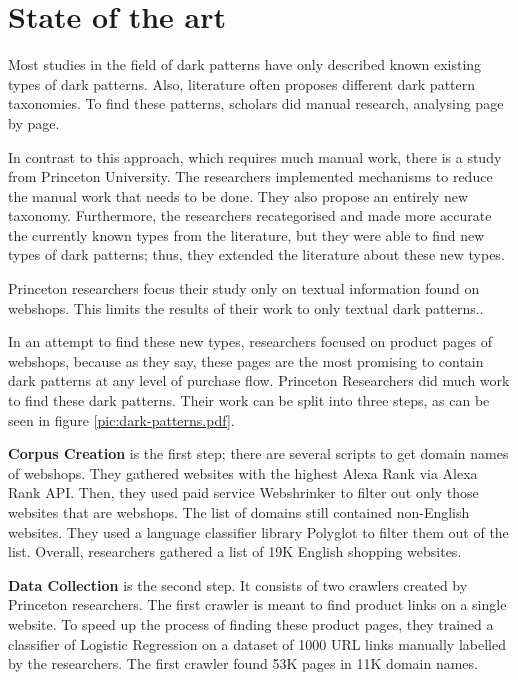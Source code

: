 \chapter{State of the art}
Most studies\cite{dark-patterns-brignull,dark-patterns-colin,taxonomies-conti} in the field of dark patterns have only described known existing types of dark patterns. Also, literature often proposes different dark pattern taxonomies. To find these patterns, scholars did manual research, analysing page by page.

In contrast to this approach, which requires much manual work, there is a study from Princeton University\cite{dark-patterns-at-scale}. The researchers implemented mechanisms to reduce the manual work that needs to be done. They also propose an entirely new taxonomy. Furthermore, the researchers recategorised and made more accurate the currently known types from the literature, but they were able to find new types of dark patterns; thus, they extended the literature about these new types.

Princeton researchers focus their study only on textual information found on webshops. This limits the results of their work to only textual dark patterns.\cite{dark-patterns-at-scale}.

In an attempt to find these new types, researchers focused on product pages of webshops, because as they say, these pages are the most promising to contain dark patterns at any level of purchase flow\cite{dark-patterns-at-scale}. Princeton Researchers did much work to find these dark patterns. Their work can be split into three steps, as can be seen in figure \ref{pic:dark-patterns.pdf}.


\textbf{Corpus Creation} is the first step; there are several scripts to get domain names of webshops. They gathered websites with the highest Alexa Rank via Alexa Rank API. Then, they used paid service Webshrinker to filter out only those websites that are webshops. The list of domains still contained non-English websites. They used a language classifier library Polyglot to filter them out of the list. Overall, researchers gathered a list of 19K English shopping websites\cite{dark-patterns-at-scale}.

\textbf{Data Collection} is the second step. It consists of two crawlers created by Princeton researchers. The first crawler is meant to find product links on a single website. To speed up the process of finding these product pages, they trained a classifier of Logistic Regression on a dataset of 1000 URL links manually labelled by the researchers. The first crawler found 53K pages in 11K domain names.

